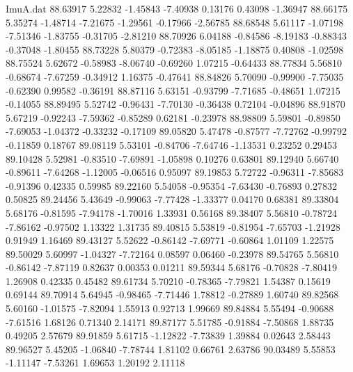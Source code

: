 \begin{filecontents}{ImuA.dat}
  88.63917    5.22832   -1.45843   -7.40938    0.13176    0.43098   -1.36947
  88.66175    5.35274   -1.48714   -7.21675   -1.29561   -0.17966   -2.56785
  88.68548    5.61117   -1.07198   -7.51346   -1.83755   -0.31705   -2.81210
  88.70926    6.04188   -0.84586   -8.19183   -0.88343   -0.37048   -1.80455
  88.73228    5.80379   -0.72383   -8.05185   -1.18875    0.40808   -1.02598
  88.75524    5.62672   -0.58983   -8.06740   -0.69260    1.07215   -0.64433
  88.77834    5.56810   -0.68674   -7.67259   -0.34912    1.16375   -0.47641
  88.84826    5.70090   -0.99900   -7.75035   -0.62390    0.99582   -0.36191
  88.87116    5.63151   -0.93799   -7.71685   -0.48651    1.07215   -0.14055
  88.89495    5.52742   -0.96431   -7.70130   -0.36438    0.72104   -0.04896
  88.91870    5.67219   -0.92243   -7.59362   -0.85289    0.62181   -0.23978
  88.98809    5.59801   -0.89850   -7.69053   -1.04372   -0.33232   -0.17109
  89.05820    5.47478   -0.87577   -7.72762   -0.99792   -0.11859    0.18767
  89.08119    5.53101   -0.84706   -7.64746   -1.13531    0.23252    0.29453
  89.10428    5.52981   -0.83510   -7.69891   -1.05898    0.10276    0.63801
  89.12940    5.66740   -0.89611   -7.64268   -1.12005   -0.06516    0.95097
  89.19853    5.72722   -0.96311   -7.85683   -0.91396    0.42335    0.59985
  89.22160    5.54058   -0.95354   -7.63430   -0.76893    0.27832    0.50825
  89.24456    5.43649   -0.99063   -7.77428   -1.33377    0.04170    0.68381
  89.33804    5.68176   -0.81595   -7.94178   -1.70016    1.33931    0.56168
  89.38407    5.56810   -0.78724   -7.86162   -0.97502    1.13322    1.31735
  89.40815    5.53819   -0.81954   -7.65703   -1.21928    0.91949    1.16469
  89.43127    5.52622   -0.86142   -7.69771   -0.60864    1.01109    1.22575
  89.50029    5.60997   -1.04327   -7.72164    0.08597    0.06460   -0.23978
  89.54765    5.56810   -0.86142   -7.87119    0.82637    0.00353    0.01211
  89.59344    5.68176   -0.70828   -7.80419    1.26908    0.42335    0.45482
  89.61734    5.70210   -0.78365   -7.79821    1.54387    0.15619    0.69144
  89.70914    5.64945   -0.98465   -7.71446    1.78812   -0.27889    1.60740
  89.82568    5.60160   -1.01575   -7.82094    1.55913    0.92713    1.99669
  89.84884    5.55494   -0.90688   -7.61516    1.68126    0.71340    2.14171
  89.87177    5.51785   -0.91884   -7.50868    1.88735    0.49205    2.57679
  89.91859    5.61715   -1.12822   -7.73839    1.39884    0.02643    2.58443
  89.96527    5.45205   -1.06840   -7.78744    1.81102    0.66761    2.63786
  90.03489    5.55853   -1.11147   -7.53261    1.69653    1.20192    2.11118

\end{filecontents}
